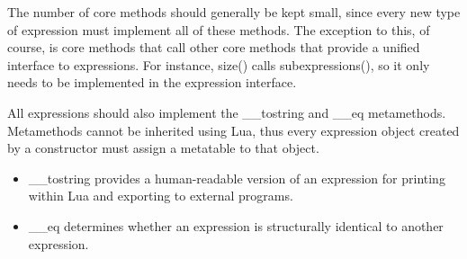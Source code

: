 \documentclass{article}
\begin{document}
The number of core methods should generally be kept small, since every new type of expression must implement all of these methods. The exception to this, of course, is core methods that call other core methods that provide a unified interface to expressions. For instance, {\ttfamily size()} calls {\ttfamily subexpressions()}, so it only needs to be implemented in the expression interface.

All expressions should also implement the {\ttfamily \_\_tostring} and {\ttfamily \_\_eq} metamethods. Metamethods cannot be inherited using Lua, thus every expression object created by a constructor must assign a metatable to that object.

\begin{itemize}
    \item {\ttfamily \_\_tostring} provides a human-readable version of an expression for printing within Lua and exporting to external programs.

    \item {\ttfamily \_\_eq} determines whether an expression is structurally identical to another expression.
\end{itemize}
\end{document}
